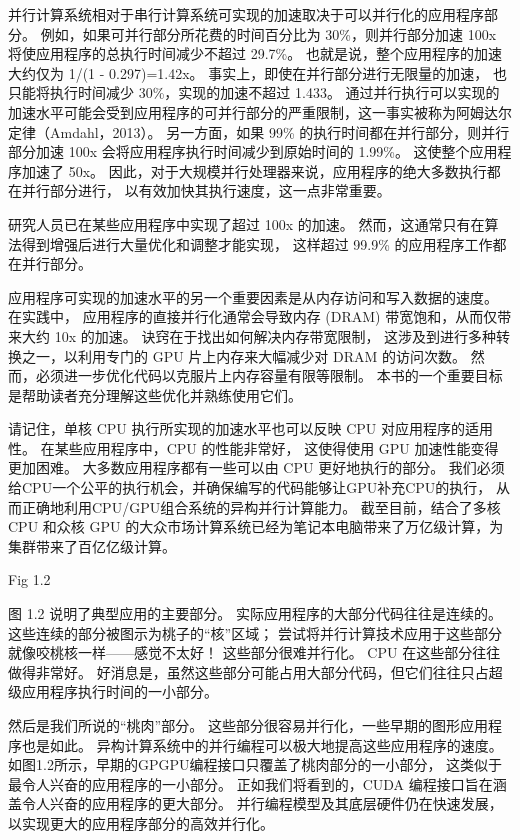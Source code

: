 并行计算系统相对于串行计算系统可实现的加速取决于可以并行化的应用程序部分。 
例如，如果可并行部分所花费的时间百分比为 30\%，则并行部分加速 100x 将使应用程序的总执行时间减少不超过 29.7\%。 
也就是说，整个应用程序的加速大约仅为 1/(1 - 0.297)=1.42x。 事实上，即使在并行部分进行无限量的加速，
也只能将执行时间减少 30\%，实现的加速不超过 1.433。 
通过并行执行可以实现的加速水平可能会受到应用程序的可并行部分的严重限制，这一事实被称为阿姆达尔定律（Amdahl，2013）。 
另一方面，如果 99\% 的执行时间都在并行部分，则并行部分加速 100x 会将应用程序执行时间减少到原始时间的 1.99\%。 
这使整个应用程序加速了 50x。 因此，对于大规模并行处理器来说，应用程序的绝大多数执行都在并行部分进行，
以有效加快其执行速度，这一点非常重要。

研究人员已在某些应用程序中实现了超过 100x 的加速。 然而，这通常只有在算法得到增强后进行大量优化和调整才能实现，
这样超过 99.9\% 的应用程序工作都在并行部分。

应用程序可实现的加速水平的另一个重要因素是从内存访问和写入数据的速度。 在实践中，
应用程序的直接并行化通常会导致内存 (DRAM) 带宽饱和，从而仅带来大约 10x 的加速。 诀窍在于找出如何解决内存带宽限制，
这涉及到进行多种转换之一，以利用专门的 GPU 片上内存来大幅减少对 DRAM 的访问次数。 
然而，必须进一步优化代码以克服片上内存容量有限等限制。 本书的一个重要目标是帮助读者充分理解这些优化并熟练使用它们。

请记住，单核 CPU 执行所实现的加速水平也可以反映 CPU 对应用程序的适用性。 在某些应用程序中，CPU 的性能非常好，
这使得使用 GPU 加速性能变得更加困难。 大多数应用程序都有一些可以由 CPU 更好地执行的部分。 
我们必须给CPU一个公平的执行机会，并确保编写的代码能够让GPU补充CPU的执行，
从而正确地利用CPU/GPU组合系统的异构并行计算能力。 
截至目前，结合了多核 CPU 和众核 GPU 的大众市场计算系统已经为笔记本电脑带来了万亿级计算，为集群带来了百亿亿级计算。

{\color{red} Fig 1.2}

图 1.2 说明了典型应用的主要部分。 实际应用程序的大部分代码往往是连续的。 这些连续的部分被图示为桃子的“核”区域； 
尝试将并行计算技术应用于这些部分就像咬桃核一样——感觉不太好！ 这些部分很难并行化。 CPU 在这些部分往往做得非常好。 
好消息是，虽然这些部分可能占用大部分代码，但它们往往只占超级应用程序执行时间的一小部分。

然后是我们所说的“桃肉”部分。 这些部分很容易并行化，一些早期的图形应用程序也是如此。 
异构计算系统中的并行编程可以极大地提高这些应用程序的速度。 如图1.2所示，早期的GPGPU编程接口只覆盖了桃肉部分的一小部分，
这类似于最令人兴奋的应用程序的一小部分。 正如我们将看到的，CUDA 编程接口旨在涵盖令人兴奋的应用程序的更大部分。 
并行编程模型及其底层硬件仍在快速发展，以实现更大的应用程序部分的高效并行化。

